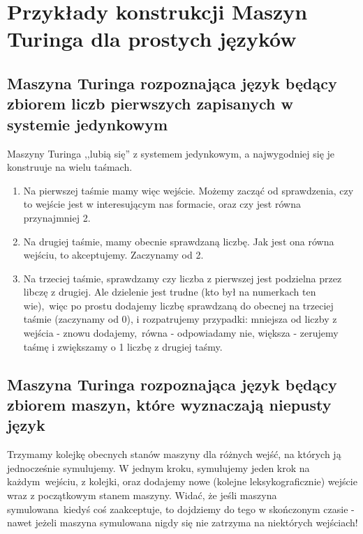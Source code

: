 \section{Przykłady konstrukcji Maszyn Turinga dla prostych języków}

\subsection{Maszyna Turinga rozpoznająca język będący zbiorem liczb pierwszych zapisanych w systemie jedynkowym}

Maszyny Turinga ,,lubią się'' z systemem jedynkowym, a najwygodniej się je konstruuje na wielu taśmach.

\begin{enumerate}
	\item Na pierwszej taśmie mamy więc wejście. Możemy zacząć od sprawdzenia, czy to wejście jest w interesującym nas formacie, oraz czy jest równa przynajmniej 2.
	\item Na drugiej taśmie, mamy obecnie sprawdzaną liczbę. Jak jest ona równa wejściu, to akceptujemy. Zaczynamy od 2.
	\item Na trzeciej taśmie, sprawdzamy czy liczba z pierwszej jest podzielna przez libczę z drugiej. Ale dzielenie jest trudne (kto był na numerkach ten wie),\
	      więc po prostu dodajemy liczbę sprawdzaną do obecnej na trzeciej taśmie (zaczynamy od 0), i rozpatrujemy przypadki: mniejsza od liczby z wejścia - znowu dodajemy,\
	      równa - odpowiadamy nie, większa - zerujemy taśmę i zwiększamy o 1 liczbę z drugiej taśmy.
\end{enumerate}

\subsection{Maszyna Turinga rozpoznająca język będący zbiorem maszyn, które wyznaczają niepusty język}

Trzymamy kolejkę obecnych stanów maszyny dla różnych wejść, na których ją jednocześnie symulujemy. W jednym kroku, symulujemy jeden krok na każdym\
wejściu, z kolejki, oraz dodajemy nowe (kolejne leksykograficznie) wejście wraz z początkowym stanem maszyny. Widać, że jeśli maszyna symulowana\
kiedyś coś zaakceptuje, to dojdziemy do tego w skończonym czasie - nawet jeżeli maszyna symulowana nigdy się nie zatrzyma na niektórych wejściach!